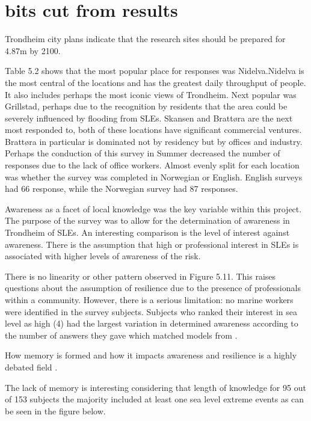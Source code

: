 \section{bits cut from results }
Trondheim city plans indicate that the research sites should be prepared for 4.87m by 2100.



Table 5.2 shows that the most popular place for responses was Nidelva.Nidelva is the most central of the locations and has the greatest daily throughput of people. It also includes perhaps the most iconic views of Trondheim.
  Next popular was Grillstad, perhaps due to the recognition by residents that the area could be severely influenced by flooding from SLEs. Skansen and Brattøra are the next most responded to, both of these locations have significant commercial ventures. Brattøra in particular is dominated not by residency but by offices and industry. Perhaps the conduction of this survey in Summer decreased the number of responses due to the lack of office workers. Almost evenly split for each location was whether the survey was completed in Norwegian or English. English surveys had 66 response, while the Norwegian survey had 87 responses.  


  Awareness as a facet of local knowledge was the key variable within this project. The purpose of the survey was to allow for the determination of awareness in Trondheim of SLEs. An interesting comparison is the level of interest against awareness. There is the assumption that high or professional interest in SLEs is associated with higher levels of awareness of the risk. 


  There is no linearity or other pattern observed in Figure 5.11. This raises questions about the assumption of resilience due to the presence of professionals within a community. However, there is a serious limitation: no marine workers were identified in the survey subjects. Subjects who ranked their interest in sea level as high (4) had the largest variation in determined awareness according to the number of answers they gave which matched models from \cite{kartverket_se_2020}. 


  How memory is formed and how it impacts awareness and resilience is a highly debated field \cite{de_guttry_expiry_2022}.

  The lack of memory is interesting considering that length of knowledge for 95 out of 153 subjects the majority included at least one sea level extreme events as can be seen in the figure below. 


